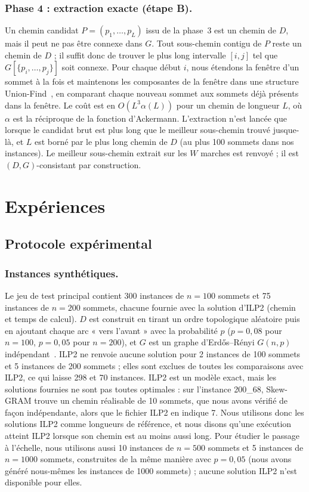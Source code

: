 \documentclass{llncs}
\begin{document}
\subsubsection{Phase 4 : extraction exacte (étape B).}
Un chemin candidat $P=(p_1,\ldots,p_L)$ issu de la phase~3 est un chemin de $D$, mais il peut ne pas être connexe dans $G$. Tout sous-chemin contigu de $P$ reste un chemin de $D$ ; il suffit donc de trouver le plus long intervalle $[i,j]$ tel que $G[\{p_i,\ldots,p_j\}]$ soit connexe. Pour chaque début $i$, nous étendons la fenêtre d'un sommet à la fois et maintenons les composantes de la fenêtre dans une structure Union-Find~\cite{tarjan1975}, en comparant chaque nouveau sommet aux sommets déjà présents dans la fenêtre. Le coût est en $O(L^3\alpha(L))$ pour un chemin de longueur $L$, où $\alpha$ est la réciproque de la fonction d'Ackermann. L'extraction n'est lancée que lorsque le candidat brut est plus long que le meilleur sous-chemin trouvé jusque-là, et $L$ est borné par le plus long chemin de $D$ (au plus 100 sommets dans nos instances). Le meilleur sous-chemin extrait sur les $W$ marches est renvoyé ; il est $(D,G)$-consistant par construction.

\section{Expériences}

\subsection{Protocole expérimental}

\subsubsection{Instances synthétiques.}
Le jeu de test principal contient 300 instances de $n=100$ sommets et 75 instances de $n=200$ sommets, chacune fournie avec la solution d'ILP2 (chemin et temps de calcul). $D$ est construit en tirant un ordre topologique aléatoire puis en ajoutant chaque arc « vers l'avant » avec la probabilité $p$ ($p=0{,}08$ pour $n=100$, $p=0{,}05$ pour $n=200$), et $G$ est un graphe d'Erd\H{o}s--Rényi $G(n,p)$ indépendant~\cite{erdos1959}. ILP2 ne renvoie aucune solution pour 2 instances de 100 sommets et 5 instances de 200 sommets ; elles sont exclues de toutes les comparaisons avec ILP2, ce qui laisse 298 et 70 instances. ILP2 est un modèle exact, mais les solutions fournies ne sont pas toutes optimales : sur l'instance 200\_68, Skew-GRAM trouve un chemin réalisable de 10 sommets, que nous avons vérifié de façon indépendante, alors que le fichier ILP2 en indique 7. Nous utilisons donc les solutions ILP2 comme longueurs de référence, et nous disons qu'une exécution atteint ILP2 lorsque son chemin est au moins aussi long. Pour étudier le passage à l'échelle, nous utilisons aussi 10 instances de $n=500$ sommets et 5 instances de $n=1000$ sommets, construites de la même manière avec $p=0{,}05$ (nous avons généré nous-mêmes les instances de 1000 sommets) ; aucune solution ILP2 n'est disponible pour elles.
\end{document}
